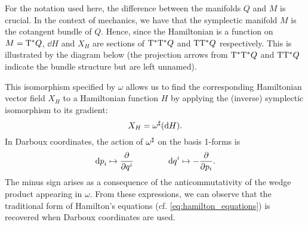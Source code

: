 For the notation used here, the difference between the manifolds \(Q\) and \(M\) is crucial. In the context of mechanics, we have that the symplectic manifold \(M\) is the cotangent bundle of \(Q\). Hence, since the Hamiltonian is a function on \(M = \mathrm{T}^*Q\), \(\dd{H}\) and \(X_H\) are sections of \(\mathrm{T}^*\mathrm{T}^*Q\) and \(\mathrm{T}\mathrm{T}^*Q\) respectively. This is illustrated by the diagram below (the projection arrows from \(\mathrm{T}^*\mathrm{T}^*Q\) and \(\mathrm{T}\mathrm{T}^*Q\) indicate the bundle structure but are left unnamed).
\begin{center}
\end{center}
This isomorphism specified by \(\omega\) allows us to find the corresponding Hamiltonian vector field \(X_H\) to a Hamiltonian function \(H\) by applying the (inverse) symplectic isomorphism to its gradient:
\begin{equation} 
    X_H = \omega^\sharp(\dd{H}). 
    \label{eq:symplectic_hamiltonian_vf}
\end{equation}
In Darboux coordinates, the action of \( \omega^\sharp\) on the basis 1-forms is
\begin{equation}
     \dd{p}_i \mapsto \pdv{}{q^i} \qquad\qquad \dd{q}^i \mapsto -\pdv{}{p_i}.
\end{equation} 
The minus sign arises as a consequence of the anticommutativity of the wedge product appearing in \(\omega\). From these expressions, we can observe that the traditional form of Hamilton's equations (cf. \cref{eq:hamilton_equations}) is recovered when Darboux coordinates are used.

